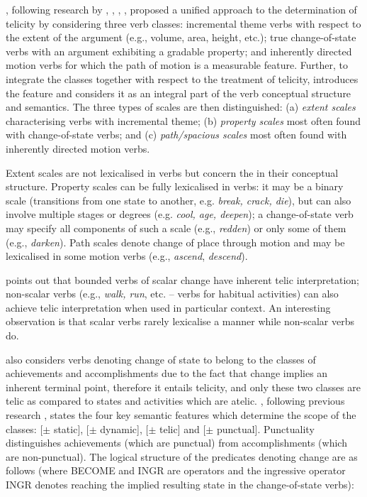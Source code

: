 \documentclass[output=paper,colorlinks,citecolor=brown]{langscibook}
\begin{document}
\citet{Levin2010}, following research by \citet{KennedyLevin2008}, \citet{Krifka1998}, \citet{RappaportHovav2008}, \citet{Beavers2008}, proposed a unified approach to the determination of telicity by considering three verb classes: incremental theme verbs with respect to the extent of the argument (e.g., volume, area, height, etc.); true change-of-state verbs with an argument exhibiting a gradable property; and inherently directed motion verbs for which the path of motion is a measurable feature. Further, to integrate the classes together with respect to the treatment of telicity, \citet[1--2]{Levin2010} introduces the feature  and considers it as an integral part of the verb conceptual structure and semantics. The three types of scales are then distinguished: (a) \emph{extent scales} characterising verbs with incremental theme; (b) \emph{property scales} most often found with change-of-state verbs; and (c) \emph{path\slash spacious scales} most often found with inherently directed motion verbs.

Extent scales are not lexicalised in verbs but concern the  in their conceptual structure. Property scales can be fully lexicalised in verbs: it may be a binary scale (transitions from one state to another, e.g. \textit{break, crack, die}), but can also involve multiple stages or degrees (e.g. \textit{cool, age, deepen}); a change-of-state verb may specify all components of such a scale (e.g., \textit{redden}) or only some of them (e.g., \textit{darken}). Path scales denote change of place through motion and may be lexicalised in some motion verbs (e.g., \textit{ascend},  \textit{descend}).

\citet[2]{Levin2010} points out that bounded verbs of scalar change have inherent telic interpretation; non-scalar verbs (e.g., \textit{walk, run}, etc. -- verbs for habitual activities) can also achieve telic interpretation when used in particular context. An interesting observation is that scalar verbs rarely lexicalise a manner while non-scalar verbs do.


\citet{VanValin2005} also considers verbs denoting change of state to belong to the classes of achievements and accomplishments due to the fact that change implies an inherent terminal point, therefore it entails telicity, and only these two classes are telic as compared to states and activities which are atelic. \citet[33]{VanValin2005}, following previous research \citep{Vendler1967,Dowty1979}, states the four key semantic features which determine the scope of the classes: [$\pm$ static], [$\pm$ dynamic], [$\pm$ telic] and [$\pm$ punctual]. Punctuality distinguishes achievements (which are punctual) from accomplishments (which are non-punctual). The logical structure of the predicates denoting change \citep[42--49]{VanValin2005} are as follows (where BECOME and INGR are operators and the ingressive operator INGR denotes reaching the implied resulting state in the change-of-state verbs):
\end{document}
